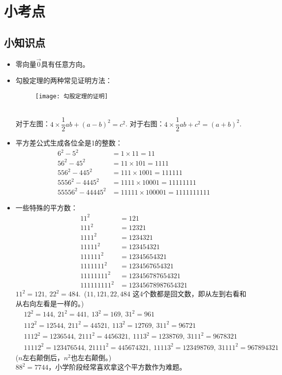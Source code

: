 \chapter{小考点}

\section{小知识点}
\begin{itemize}[leftmargin=\inteval{\myitemleftmargin}pt,itemsep=
   \inteval{\myitemitempsep}pt,topsep=\inteval{\myitemtopsep}pt]
\item  零向量$ \vec{0} $具有任意方向。

\item 勾股定理的两种常见证明方法：
\begin{figure}[htbp]
    \centering
    \texttt{[image: 勾股定理的证明]}
\end{figure}  \\
对于左图：$ 4\times \dfrac{1}{2}ab+(a-b)^2=c^2 $. \hspace{2cm} 
对于右图：$ 4\times \dfrac{1}{2}ab+c^2=(a+b)^2 $. 

\item 平方差公式生成各位全是1的整数：
\begin{align*}
    6^2-5^2 &=1\times 11 = 11 \\
    56^2-45^2 &=11\times 101= 1111 \\
    556^2-445^2 &=111\times 1001= 111111 \\
    5556^2-4445^2 &=1111\times 10001=11111111 \\
    55556^2-44445^2 &=11111\times 100001=1111111111 
\end{align*}

\item 一些特殊的平方数：
\begin{align*}
    11^2&=121 \\
    111^2&=12321 \\
    1111^2&=1234321 \\
    11111^2&=123454321 \\
    111111^2&=12345654321 \\
    1111111^2&=1234567654321 \\
    11111111^2&=123456787654321 \\
    111111111^2&=12345678987654321 
\end{align*}
$ 11^2=121,\ 22^2=484 $.\ ($ 11,121,22,484 $
这4个数都是回文数，即从左到右看和从右向左看是一样的。) 
\begin{align*}
    & 12^2=144,\ 21^2=441,\ 13^2=169,\ 31^2=961 \\
    & 112^2=12544,\ 211^2=44521,\ 113^2=12769,\ 311^2=96721 \\
    & 1112^2=1236544,\ 2111^2=4456321,\ 1113^2=1238769,\ 3111^2=9678321 \\
    & 11112^2=123476544,\ 21111^2=445674321,\ 11113^2=123498769,\ 
    31111^2=967894321
\end{align*}
($ n $左右颠倒后，$ n^2 $也左右颠倒。)\\
$ 88^2=7744 $，小学阶段经常喜欢拿这个平方数作为难题。


\end{itemize}
